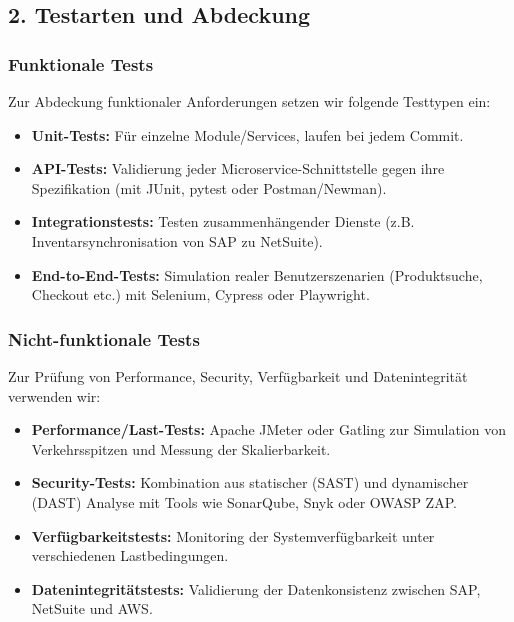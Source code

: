 \subsection{2. Testarten und Abdeckung}

\subsubsection{Funktionale Tests}

Zur Abdeckung funktionaler Anforderungen setzen wir folgende Testtypen ein:
\begin{itemize}
    \item \textbf{Unit-Tests:} Für einzelne Module/Services, laufen bei jedem Commit.
    \item \textbf{API-Tests:} Validierung jeder Microservice-Schnittstelle gegen ihre Spezifikation
    (mit JUnit, pytest oder Postman/Newman).
    \item \textbf{Integrationstests:} Testen zusammenhängender Dienste (z.B. Inventarsynchronisation
    von SAP zu NetSuite).
    \item \textbf{End-to-End-Tests:} Simulation realer Benutzerszenarien (Produktsuche, Checkout etc.)
    mit Selenium, Cypress oder Playwright.
\end{itemize}

\subsubsection{Nicht-funktionale Tests}
Zur Prüfung von Performance, Security, Verfügbarkeit und Datenintegrität verwenden wir:

\begin{itemize}
    \item \textbf{Performance/Last-Tests:} Apache JMeter oder Gatling zur Simulation von
    Verkehrsspitzen und Messung der Skalierbarkeit.
    \item \textbf{Security-Tests:} Kombination aus statischer (SAST) und dynamischer (DAST)
    Analyse mit Tools wie SonarQube, Snyk oder OWASP ZAP.
    \item \textbf{Verfügbarkeitstests:} Monitoring der Systemverfügbarkeit unter verschiedenen
    Lastbedingungen.
    \item \textbf{Datenintegritätstests:} Validierung der Datenkonsistenz zwischen SAP,
    NetSuite und AWS.
\end{itemize}


